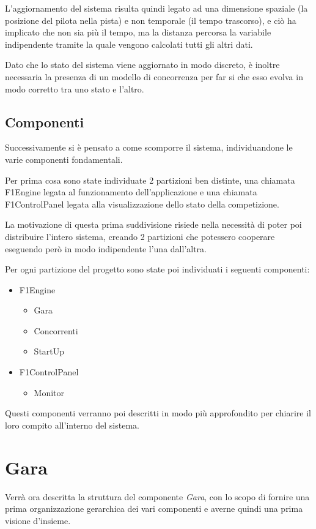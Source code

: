 \documentclass[a4paper,11pt, twoside]{book}
\begin{document}
	L'aggiornamento del sistema risulta quindi legato ad una dimensione spaziale (la posizione del pilota nella pista)
	e non temporale (il tempo trascorso), e ciò ha implicato
	che non sia più il tempo, ma la distanza percorsa la variabile indipendente tramite 
	la quale vengono calcolati tutti gli altri dati.
	
	Dato che lo stato del sistema viene aggiornato in modo discreto, è inoltre necessaria la presenza di un modello
	di concorrenza per far si che esso evolva in modo corretto tra uno stato e l'altro.
		
      \subsection{Componenti}
	Successivamente si è pensato a come scomporre il sistema, individuandone le varie componenti fondamentali.
      
	Per prima cosa sono state individuate 2 partizioni ben distinte, una chiamata F1Engine legata al 
	funzionamento dell'applicazione e una chiamata F1ControlPanel legata alla visualizzazione dello stato della competizione.
	
	La motivazione di questa prima suddivisione risiede nella necessità di poter poi distribuire l'intero sistema,
	creando 2 partizioni che potessero cooperare eseguendo però in modo indipendente l'una dall'altra.
	
	Per ogni partizione del progetto sono state poi individuati i seguenti componenti:
	
	\begin{itemize}
	  \item F1Engine
	  \begin{itemize}
	    \item Gara 
	    \item Concorrenti
	    \item StartUp
	  \end{itemize}
	  \item F1ControlPanel
	  \begin{itemize}
	    \item Monitor
	  \end{itemize}
	\end{itemize}
	
	Questi componenti verranno poi descritti in modo più approfondito per chiarire il loro compito all'interno del
	sistema.
	
    \section{Gara}
      Verrà ora descritta la struttura del componente \textsl{Gara}, con lo scopo di fornire una prima organizzazione gerarchica 
      dei vari componenti e averne quindi una prima visione d'insieme.
      
\end{document}
